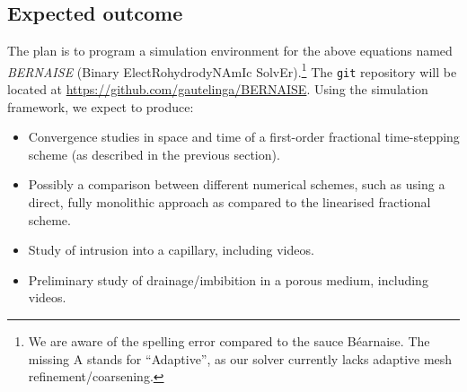 \documentclass[a4paper,10pt]{article}
\begin{document}
\subsection*{Expected outcome} 
The plan is to program a simulation environment for the above equations named \emph{BERNAISE} (Binary ElectRohydrodyNAmIc SolvEr).\footnote{We are aware of the spelling error compared to the sauce B\'{e}arnaise. The missing A stands for ``Adaptive'', as our solver currently lacks adaptive mesh refinement/coarsening.}
The \texttt{git} repository will be located at \url{https://github.com/gautelinga/BERNAISE}.
Using the simulation framework, we expect to produce:
\begin{itemize}
\item Convergence studies in space and time of a first-order fractional time-stepping scheme (as described in the previous section).
\item Possibly a comparison between different numerical schemes, such as using a direct, fully monolithic approach as compared to the linearised fractional scheme.
\item Study of intrusion into a capillary, including videos.
\item Preliminary study of drainage/imbibition in a porous medium, including videos.
\end{itemize}



\end{document}
